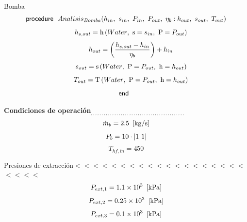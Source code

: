 \documentclass[10pt,fleqn]{article}
\theoremstyle{mytheoremstyle}
\theoremstyle{mytheoremstyle}
\theoremstyle{myproblemstyle}
\newcommand{\F}[1]{\mbox{$#1$}}
\newcommand{\K}[1]{\mbox{\sf#1\ \ \mit}}
\newcommand{\I}{\mbox{\hspace{0.20in}}}
\newcommand{\temperature}{\mathrm{T}}
\newcommand{\enthalpy}{\mathrm{h}}
\newcommand{\entropy}{\mathrm{s}}
\begin{document}
\vspace{0.10in}
\noindent
\vspace{0.1 in}
{\color{blue} \rm Bomba}
\begin{equation}
\label{EES Eqn:7}
\K{procedure} \F{Analisis_{Bomba}}{ \left( h_{in},\ s_{in},\ P_{in},\ P_{out},\ \eta_{b}:h_{out},\ s_{out},\ T_{out} \right) } 
\end{equation}
\begin{equation}
\I \label{EES Eqn:8}
h_{s,out} = \enthalpy \left(\F{Water},\mbox{\ s}=s_{in},\mbox{\ P}=P_{out} \right)  
\end{equation}
\begin{equation}
\I \label{EES Eqn:9}
h_{out} =  \left( \frac {h_{s,out}-h_{in}}{ \eta_{b} } \right) +h_{in} 
\end{equation}
\begin{equation}
\I \label{EES Eqn:10}
s_{out} = \entropy \left(\F{Water},\mbox{\ P}=P_{out},\mbox{\ h}=h_{out} \right)  
\end{equation}
\begin{equation}
\I \label{EES Eqn:11}
T_{out} = \temperature \left(\F{Water},\mbox{\ P}=P_{out},\mbox{\ h}=h_{out} \right)  
\end{equation}
\begin{equation}
\label{EES Eqn:12}
\K{end} 
\end{equation}

\vspace{0.10in}
\noindent
\vspace{0.1 in}
{\color{red} \bf Condiciones de operación$_{,,,,,,,,,,,,,,,,,,,,,,,,,,,,,,,,,,,,,,,,,,,,}$}
\begin{equation}
\label{EES Eqn:13}
\dot {m}_{b} = 2.5  \   \left[ \rm kg/s \right] 
\end{equation}
{\color{blue} \rm}
\begin{equation}
\label{EES Eqn:14}
P_{b} = 10\cdot \rm { \left|1\ {\rm1} \right|} 
\end{equation}
\begin{equation}
\label{EES Eqn:15}
T_{hf,in} = 450 
\end{equation}

\vspace{0.10in}
\noindent
{\color{blue} \rm Presiones de  extracción$<$$<$$<$$<$$<$$<$$<$$<$$<$$<$$<$$<$$<$$<$$<$$<$$<$$<$$<$$<$$<$$<$$<$}
\begin{equation}
\label{EES Eqn:16}
P_{ext,1} = 1.1\times 10^{3}  \   \left[ \rm kPa \right] 
\end{equation}
{\color{blue} \rm}
\begin{equation}
\label{EES Eqn:17}
P_{ext,2} = 0.25\times 10^{3}  \   \left[ \rm kPa \right] 
\end{equation}
{\color{blue} \rm}
\begin{equation}
\label{EES Eqn:18}
P_{ext,3} = 0.1\times 10^{3}  \   \left[ \rm kPa \right] 
\end{equation}
{\color{blue} \rm}
\end{document}
